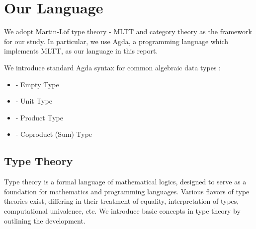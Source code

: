 \begin{code}[hide]%
\>[0]\AgdaSpace{}%
\AgdaSpace{}%
\<%
\\
\>[0]\AgdaSpace{}%
\AgdaSpace{}%
\<%
\\
\>[0]\AgdaSpace{}%
\AgdaSpace{}%
\<%
\\
%
\\[\AgdaEmptyExtraSkip]%
\>[0]\AgdaSpace{}%
\AgdaSymbol{:}\AgdaSpace{}%
\<%
\\
\>[0]\AgdaSpace{}%
\AgdaSymbol{=}\AgdaSpace{}%
\<%
\\
%
\\[\AgdaEmptyExtraSkip]%
\>[0]%
\>[7]\AgdaSpace{}%
\<%
\end{code}

\section{Our Language}

We adopt Martin-L\"{o}f type theory - MLTT and category theory as the framework for our study. In particular, we use Agda, a programming language which implements MLTT, as our language in this report.

We introduce standard Agda syntax for common algebraic data types :
\begin{itemize}
  \item{ - Empty Type}
  \item{ - Unit Type}
  \item{ - Product Type}
  \item{ - Coproduct (Sum) Type}
\end{itemize}

\subsection{Type Theory}

Type theory is a formal language of mathematical logics, designed to serve as a foundation for mathematics and programming languages. Various flavors of type theories exist, differing in their treatment of equality, interpretation of types, computational univalence, etc. We introduce basic concepts in type theory by outlining the development.

